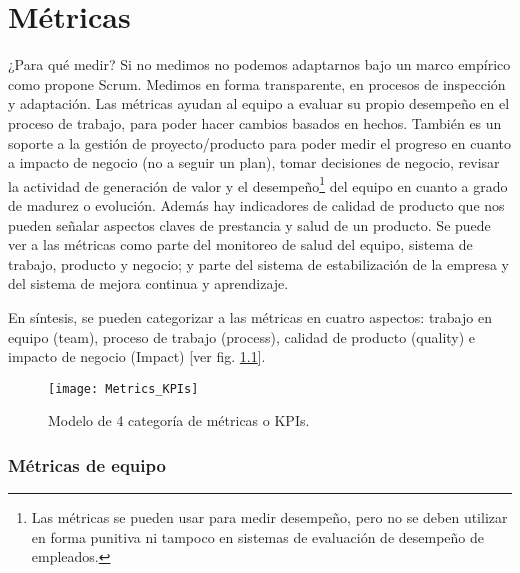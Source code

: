 \chapter{Métricas}

¿Para qué medir? Si no medimos no podemos adaptarnos bajo un marco empírico como propone Scrum. Medimos en forma transparente, en procesos de inspección y adaptación. Las métricas ayudan al equipo a evaluar su propio desempeño en el proceso de trabajo, para poder hacer cambios basados en hechos. También es un soporte a la gestión de proyecto/producto para poder medir el progreso en cuanto a impacto de negocio (no a seguir un plan), tomar decisiones de negocio, revisar la actividad de generación de valor y el desempeño\footnote{Las métricas se pueden usar para medir desempeño, pero no se deben utilizar en forma punitiva ni tampoco en sistemas de evaluación de desempeño de empleados.} del equipo en cuanto a grado de madurez o evolución. Además hay indicadores de calidad de producto que nos pueden señalar aspectos claves de prestancia y salud de un producto. Se puede ver a las métricas como parte del monitoreo de salud del equipo, sistema de trabajo, producto y negocio; y parte del sistema de estabilización de la empresa y del sistema de mejora continua y aprendizaje.

En síntesis, se pueden categorizar a las métricas en cuatro aspectos: trabajo en equipo (team), proceso de trabajo (process), calidad de producto (quality) e impacto de negocio (Impact) [ver fig. \ref{fig:Metrics_KPIs}].

\begin{figure}[h]
  \centering
  \texttt{[image: Metrics\_KPIs]}
  \caption{Modelo de 4 categoría de métricas o KPIs.}
  \centering
  \label{fig:Metrics_KPIs} %
\end{figure}
\FloatBarrier %

\subsection{Métricas de equipo}

